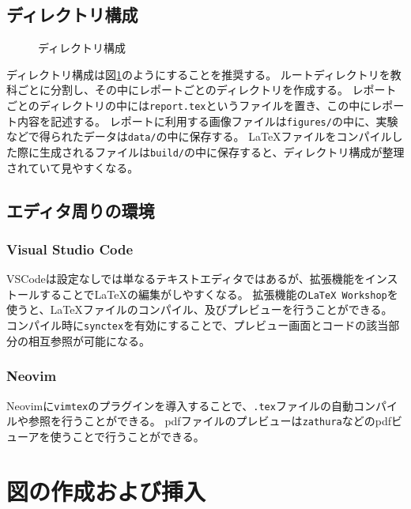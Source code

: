 \subsection{ディレクトリ構成}

\begin{figure}[H]
    \centering
    
    \caption{ディレクトリ構成}
    \label{fig:directory}
\end{figure}

ディレクトリ構成は図\ref{fig:directory}のようにすることを推奨する。
ルートディレクトリを教科ごとに分割し、その中にレポートごとのディレクトリを作成する。
レポートごとのディレクトリの中には\verb|report.tex|というファイルを置き、この中にレポート内容を記述する。
レポートに利用する画像ファイルは\verb|figures/|の中に、実験などで得られたデータは\verb|data/|の中に保存する。
\LaTeX ファイルをコンパイルした際に生成されるファイルは\verb|build/|の中に保存すると、ディレクトリ構成が整理されていて見やすくなる。

\subsection{エディタ周りの環境}

\subsubsection{Visual Studio Code}

VSCodeは設定なしでは単なるテキストエディタではあるが、拡張機能をインストールすることで\LaTeX の編集がしやすくなる。
拡張機能の\verb|LaTeX Workshop|を使うと、\LaTeX ファイルのコンパイル、及びプレビューを行うことができる。
コンパイル時に\verb|synctex|を有効にすることで、プレビュー画面とコードの該当部分の相互参照が可能になる。

\subsubsection{Neovim}

Neovimに\verb|vimtex|のプラグインを導入することで、\verb|.tex|ファイルの自動コンパイルや参照を行うことができる。
pdfファイルのプレビューは\verb|zathura|などのpdfビューアを使うことで行うことができる。

\section{図の作成および挿入}

